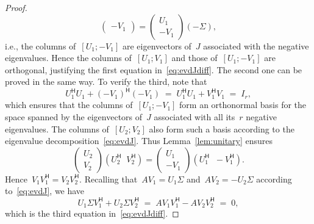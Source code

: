\documentclass[11pt,a4paper]{article}
\theoremstyle{definition}
\newcommand{\hmt}{{\scriptscriptstyle{{\mathsf{H}}}}}
\newcommand{\ie}{{i.e.}}
\begin{document}
\begin{proof}
\begin{equation}
\begin{pmatrix}
      -V_1
    \end{pmatrix}
    = 
    \begin{pmatrix}
      U_1 \\
      -V_1
    \end{pmatrix}
    (-\Sigma),
  \end{equation}
  \ie, the columns of~$[U_1; -V_1]$ are eigenvectors of~$J$ associated with the negative eigenvalues.
  Hence the columns of~$[U_1; V_1]$ and those of~$[U_1; -V_1]$ are orthogonal, justifying the first
  equation in~\eqref{eq:evdJdiff}. The second one can be proved in the same way. 
  To verify the third, note that  
  \begin{equation*}
    U_1^\hmt U_1 + (-V_1)^\hmt (-V_1) \;=\; U_1^\hmt U_1 + V_1^\hmt V_1 \;=\; I_r,
  \end{equation*}
  which ensures that 
  the columns of~$[U_1; -V_1]$ form an orthonormal basis for the space spanned by the eigenvectors
  of~$J$ associated with all its~$r$ negative eigenvalues. The columns of~$[U_2; V_2]$ 
  also form such a basis according to the eigenvalue decomposition~\eqref{eq:evdJ}. Thus
  Lemma~\ref{lem:unitary} ensures
  \begin{equation*}
    \begin{pmatrix}
      U_2\\
      V_2 
    \end{pmatrix}
    (U_2^\hmt\;\; V_2^\hmt)
    =
    \begin{pmatrix}
      U_1\\
      -V_1
    \end{pmatrix}
    (U_1^\hmt\;\; -\!V_1^\hmt).
  \end{equation*}
  Hence~$V_1V_1^\hmt = V_2V_2^\hmt$. Recalling that~$AV_1 = U_1\Sigma$ and~$AV_2 = -U_2\Sigma$
  according to~\eqref{eq:evdJ}, 
  we have
  \begin{equation*}
    U_1\Sigma V_1^\hmt + U_2\Sigma V_2^\hmt 
    \;=\; AV_1V_1^\hmt - AV_2V_2^\hmt 
    \;=\; 0,
  \end{equation*}
  which is the third equation in~\eqref{eq:evdJdiff}.


\end{proof}
\end{document}
